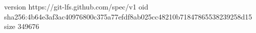 version https://git-lfs.github.com/spec/v1
oid sha256:4b64e3af3ac40976800c375a77efdf8ab025cc48210b71847865538239258d15
size 349676
